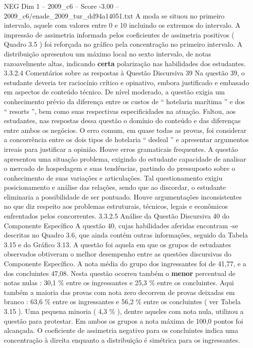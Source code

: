 \begin{textsample}{NEG Dim 1 – 2009\_c6 – Score -3.00 – 2009\_c6/enade\_2009\_tur\_dd94a14051.txt}
A moda se situou no primeiro intervalo, aquele com valores entre 0 e 10 incluindo os extremos do intervalo.
A impressão de assimetria informada pelos coeficientes de assimetria positivos ( Quadro 3.5 ) foi reforçada no gráfico pela concentração no primeiro intervalo.
A distribuição apresentou um máximo local no sexto intervalo, de notas razoavelmente altas, indicando \textbf{certa} polarização nas habilidades dos estudantes. 3.3.2.4 Comentários sobre as respostas à Questão Discursiva 39 Na questão 39, o estudante deveria ter raciocínio crítico e opinativo, embora justificado e embasado em aspectos de conteúdo técnico.
De nível moderado, a questão exigia um conhecimento prévio da diferença entre os custos de “ hotelaria marítima ” e dos “ resorts ”, bem como suas respectivas especificidades na atuação.
Faltou, aos estudantes, nas respostas dessa questão o domínio do conteúdo e das diferenças entre ambos os negócios.
O erro comum, em quase todas as provas, foi considerar a concorrência entre os dois tipos de hotelaria “ desleal ” e apresentar argumentos irreais para justificar a opinião.
Houve erros gramaticais frequentes.
A questão apresentou uma situação problema, exigindo do estudante capacidade de analisar o mercado de hospedagem e suas tendências, partindo do pressuposto sobre o conhecimento de suas variações e articulações.
Tal questionamento exigiu posicionamento e análise das relações, sendo que ao discordar, o estudante eliminaria a possibilidade de ser pontuado.
Houve argumentações inconsistentes no que diz respeito aos problemas estruturais, técnicos, legais e econômicos enfrentados pelos concorrentes. 3.3.2.5 Análise da Questão Discursiva 40 do Componente Específico A questão 40, cujas habilidades aferidas encontram -se descritas no Quadro 3.6, que ainda contém outras informações, seguido da Tabela 3.15 e do Gráfico 3.13.
A questão foi aquela em que os grupos de estudantes observados obtiveram o melhor desempenho entre as questões discursivas do Componente Específico.
A nota média do grupo dos ingressantes foi de 41,77, e a dos concluintes 47,08.
Nesta questão ocorreu também o \textbf{menor} percentual de notas nulas : 30,1 \% entre os ingressantes e 25,3 \% entre os concluintes.
Aqui também a maioria das provas com nota zero decorrem de provas deixadas em branco : 63,6 \% entre os ingressantes e 56,2 \% entre os concluintes ( ver Tabela 3.15 ).
Uma pequena minoria ( 4,3 \% ), dentre aqueles com nota nula, utilizou a questão para protestar.
Em ambos os grupos a nota máxima de 100,0 pontos foi alcançada.
O coeficiente de assimetria negativo para os concluintes indica uma concentração à direita enquanto a distribuição é simétrica para os ingressantes.

\end{textsample}
